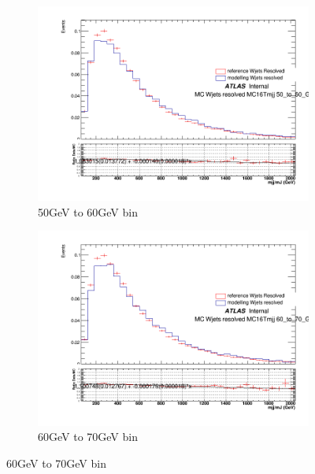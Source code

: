 \begin{figure}[ht]
    \centering
    \begin{subfigure}[b]{0.3\textwidth}
        \centering
        \includegraphics[width=\textwidth]{figures/mjjreweight1lep/resolved_Wjets50_to_60_GeVMC16T.png}
        \caption{50GeV to 60GeV bin}
        \label{fig:resolved_Wjets50to60}
    \end{subfigure}
    \hfill %
    \begin{subfigure}[b]{0.3\textwidth}
        \centering
        \includegraphics[width=\textwidth]{figures/mjjreweight1lep/resolved_Wjets60_to_70_GeVMC16T.png}
        \caption{60GeV to 70GeV bin}
        \label{fig:resolved_Wjets60to70}
    \end{subfigure}

\end{figure}
